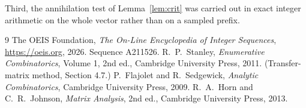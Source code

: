 \documentclass[11pt,a4paper]{article}
\theoremstyle{plain}
\theoremstyle{definition}
\begin{document}
Third, the annihilation test of Lemma~\ref{lem:crit} was carried out in exact integer
arithmetic on the whole vector rather than on a sampled prefix.

\begin{thebibliography}{9}
 The OEIS Foundation, \emph{The On-Line Encyclopedia of Integer
Sequences}, \url{https://oeis.org}, 2026. Sequence A211526.
 R.~P.~Stanley, \emph{Enumerative Combinatorics}, Volume 1, 2nd ed.,
Cambridge University Press, 2011. (Transfer-matrix method, Section 4.7.)
 P.~Flajolet and R.~Sedgewick, \emph{Analytic Combinatorics}, Cambridge
University Press, 2009.
 R.~A.~Horn and C.~R.~Johnson, \emph{Matrix Analysis}, 2nd ed., Cambridge
University Press, 2013.
\end{thebibliography}
\end{document}
